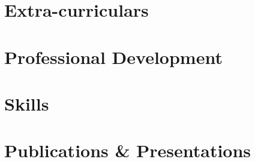 \documentclass{resume} %
\begin{document}
\section{Extra-curriculars}

\section{Professional Development}

\section{Skills}

\section{Publications \& Presentations}

\vfill
{}

\end{document}
